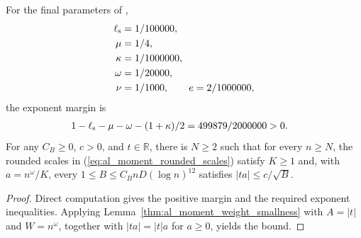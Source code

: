 \begin{lemma}
    \label{thm:al_moment_final_scales}
    \leanok
    For the final parameters of
    \cite[Section~9, lines~839--865]{OpenAI2026AreaLaw},
    \begin{align}
        \ell_{\rm s} & =1/100000,                  \\
        \mu          & =1/4,                       \\
        \kappa       & =1/1000000,                 \\
        \omega       & =1/20000,                   \\
        \nu          & =1/1000,\qquad e=2/1000000,
    \end{align}
    the exponent margin is
    \begin{align}
        1-\ell_{\rm s}-\mu-\omega-(1+\kappa)/2
         & =499879/2000000>0.
    \end{align}
    For any $C_B\ge0$, $c>0$, and $t\in\mathbb R$, there is $N\ge2$ such
    that for every $n\ge N$, the rounded scales in
    (\ref{eq:al_moment_rounded_scales}) satisfy $K\ge1$ and, with
    $a=n^\omega/K$, every $1\le B\le C_BnD(\log n)^{12}$ satisfies
    $|ta|\le c/\sqrt B$.
\end{lemma}
\begin{proof}\leanok
    Direct computation gives the positive margin and the required exponent
    inequalities. Applying Lemma~\ref{thm:al_moment_weight_smallness} with
    $A=|t|$ and $W=n^\omega$, together with $|ta|=|t|a$ for $a\ge0$, yields
    the bound.
\end{proof}
